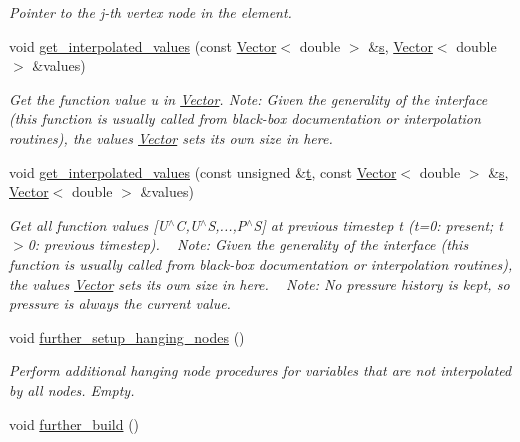 \begin{DoxyCompactItemize}
\begin{DoxyCompactList}\small\item\em Pointer to the j-\/th vertex node in the element. \end{DoxyCompactList}\item 
void \hyperlink{classoomph_1_1RefineableLinearisedQCrouzeixRaviartElement_ab705dd0e3b0d4e6feeb8e4273c944e7d}{get\+\_\+interpolated\+\_\+values} (const \hyperlink{classoomph_1_1Vector}{Vector}$<$ double $>$ \&\hyperlink{cfortran_8h_ab7123126e4885ef647dd9c6e3807a21c}{s}, \hyperlink{classoomph_1_1Vector}{Vector}$<$ double $>$ \&values)
\begin{DoxyCompactList}\small\item\em Get the function value u in \hyperlink{classoomph_1_1Vector}{Vector}. Note\+: Given the generality of the interface (this function is usually called from black-\/box documentation or interpolation routines), the values \hyperlink{classoomph_1_1Vector}{Vector} sets its own size in here. \end{DoxyCompactList}\item 
void \hyperlink{classoomph_1_1RefineableLinearisedQCrouzeixRaviartElement_a19d64ef35896641f1f6b8e15eb4ad606}{get\+\_\+interpolated\+\_\+values} (const unsigned \&\hyperlink{cfortran_8h_af6f0bd3dc13317f895c91323c25c2b8f}{t}, const \hyperlink{classoomph_1_1Vector}{Vector}$<$ double $>$ \&\hyperlink{cfortran_8h_ab7123126e4885ef647dd9c6e3807a21c}{s}, \hyperlink{classoomph_1_1Vector}{Vector}$<$ double $>$ \&values)
\begin{DoxyCompactList}\small\item\em Get all function values \mbox{[}U$^\wedge$C,U$^\wedge$S,...,P$^\wedge$S\mbox{]} at previous timestep t (t=0\+: present; t$>$0\+: previous timestep). ~\newline
 Note\+: Given the generality of the interface (this function is usually called from black-\/box documentation or interpolation routines), the values \hyperlink{classoomph_1_1Vector}{Vector} sets its own size in here. ~\newline
Note\+: No pressure history is kept, so pressure is always the current value. \end{DoxyCompactList}\item 
void \hyperlink{classoomph_1_1RefineableLinearisedQCrouzeixRaviartElement_afc31da5de97e9cc03bfc6106e08820f3}{further\+\_\+setup\+\_\+hanging\+\_\+nodes} ()
\begin{DoxyCompactList}\small\item\em Perform additional hanging node procedures for variables that are not interpolated by all nodes. Empty. \end{DoxyCompactList}\item 
void \hyperlink{classoomph_1_1RefineableLinearisedQCrouzeixRaviartElement_a175965274f4f4545e086d19f446c9ce9}{further\+\_\+build} ()
\end{DoxyCompactItemize}
